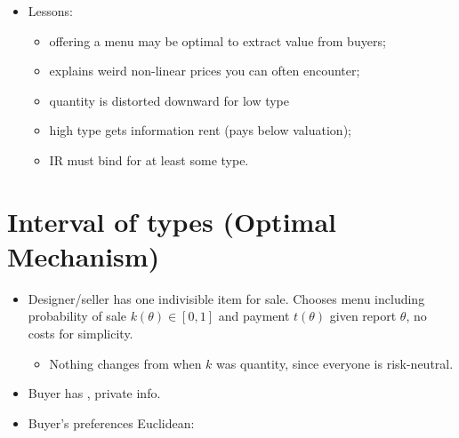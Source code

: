 \documentclass[english,handout]{beamer}		%
\def\lyxframeend{} %
\begin{document}
\begin{itemize}
	\item Lessons:
	\begin{itemize}[<+->]
		\item offering a menu may be optimal to extract value from buyers;
		\item explains weird non-linear prices you can often encounter; %
		\item quantity is distorted downward for low type
		\item high type gets information rent (pays below valuation);
		\item IR must bind for at least some type.
	\end{itemize}
\end{itemize}
\lyxframeend


\section{Interval of types (Optimal Mechanism)}

\begin{itemize}
	\item Designer/seller has one indivisible item for sale. Chooses menu including probability of sale $k(\theta) \in [0,1]$ and payment $t(\theta)$ given report $\theta$, no costs for simplicity.
	\begin{itemize}
		\item Nothing changes from when $k$ was quantity, since everyone is risk-neutral.
	\end{itemize}
	\item Buyer has , private info.
	\item Buyer's preferences Euclidean: 
\end{itemize}
\lyxframeend
\end{document}
